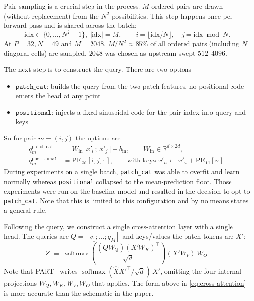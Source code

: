 \documentclass[final_report.tex]{subfiles}
\begin{document}
Pair sampling is a crucial step in the process. $M$ ordered pairs are drawn (without replacement) from the $N^2$ possibilities. This step happens once per forward pass and is shared across the batch:
\begin{equation}\label{eq:pair-sampling}
  \mathrm{idx} \subset \{0, \dots, N^2 - 1\},\; |\mathrm{idx}| = M,
  \qquad
  i = \bigl\lfloor \mathrm{idx} / N \bigr\rfloor,
  \quad
  j = \mathrm{idx} \bmod N .
\end{equation}
At $P=32,N=49$ and $M=2048$, $M/N^2\approx85\%$ of all ordered pairs (including $N$ diagonal cells) are sampled. $2048$ was chosen as upstream swept $512$--$4096$.

The next step is to construct the query. There are two options
\begin{itemize}
\item $\texttt{patch\_cat}$: builds the query from the two patch features, no positional code enters the head at any point
\item $\texttt{positional}$: injects a fixed sinusoidal code for the pair index into query and keys
\end{itemize}
So for pair $m=(i,j)$ the options are
\begin{align}
  q_m^{\texttt{patch\_cat}} &= W_{\mathrm{in}}\bigl[\,x'_i \,;\, x'_j\,\bigr] + b_{\mathrm{in}},
  \qquad W_{\mathrm{in}} \in \mathbb{R}^{d \times 2d},
  \label{eq:query-patchcat}\\
  q_m^{\texttt{positional}} &= \mathrm{PE}_{2\mathrm{d}}[i, j, :],
  \qquad\text{with keys } x'_n \leftarrow x'_n + \mathrm{PE}_{1\mathrm{d}}[n].
  \label{eq:query-positional}
\end{align}
During experiments on a single batch, \texttt{patch\_cat} was able to overfit and learn normally whereas \texttt{positional} collapsed to the mean-prediction floor. Those experiments were run on the baseline model and resulted in the decision to opt to \texttt{patch\_cat}. Note that this is limited to this configuration and by no means states a general rule.

Following the query, we construct a single cross-attention layer with a single head. The queries are $Q = [q_1; \dots; q_M]$ and keys/values the patch tokens are $X'$:
\begin{equation}\label{eq:cross-attention}
  Z \;=\; \operatorname{softmax}\!\left(\frac{(Q W_Q)(X' W_K)^{\!\top}}{\sqrt{d}}\right)(X' W_V)\, W_O .
\end{equation}
Note that PART~\cite{part} writes $\operatorname{softmax}(\hat X X'^{\!\top}/\sqrt{d})\,X'$, omitting the four internal
projections $W_Q, W_K, W_V, W_O$ that  applies. The form above in \cref{eq:cross-attention} is more accurate than the schematic in the paper.
\end{document}
